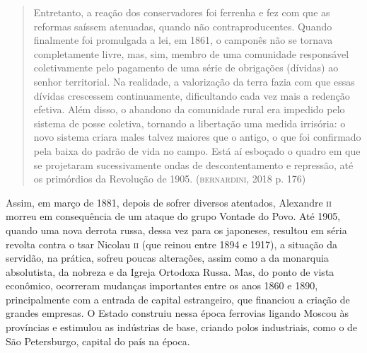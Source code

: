 \documentclass[11pt]{extarticle}
\begin{document}
\begin{quote}
Entretanto, a reação dos conservadores foi ferrenha e fez com que as
reformas saíssem atenuadas, quando não contraproducentes. Quando
finalmente foi promulgada a lei, em 1861, o camponês não se tornava
completamente livre, mas, sim, membro de uma comunidade responsável
coletivamente pelo pagamento de uma série de obrigações (dívidas) ao
senhor territorial. Na realidade, a valorização da terra fazia com que
essas dívidas crescessem continuamente, dificultando cada vez mais a
redenção efetiva. Além disso, o abandono da comunidade rural era
impedido pelo sistema de posse coletiva, tornando a libertação uma
medida irrisória: o novo sistema criara males talvez maiores que o
antigo, o que foi confirmado pela baixa do padrão de vida no campo. Está
aí esboçado o quadro em que se projetaram sucessivamente ondas de
descontentamento e repressão, até os primórdios da Revolução de 1905.
(\textsc{bernardini}, 2018 p. 176)
\end{quote}


Assim, em março de 1881, depois de sofrer diversos atentados, Alexandre
\textsc{ii} morreu em consequência de um ataque do grupo Vontade do Povo. Até
1905, quando uma nova derrota russa, dessa vez para os japoneses,
resultou em séria revolta contra o tsar Nicolau \textsc{ii} (que reinou entre
1894 e 1917), a situação da servidão, na prática, sofreu poucas
alterações, assim como a da monarquia absolutista, da nobreza e da
Igreja Ortodoxa Russa. Mas, do ponto de vista econômico, ocorreram
mudanças importantes entre os anos 1860 e 1890, principalmente com a
entrada de capital estrangeiro, que financiou a criação de grandes
empresas. O Estado construiu nessa época ferrovias ligando Moscou às
províncias e estimulou as indústrias de base, criando polos industriais,
como o de São Petersburgo, capital do país na época.
\end{document}

